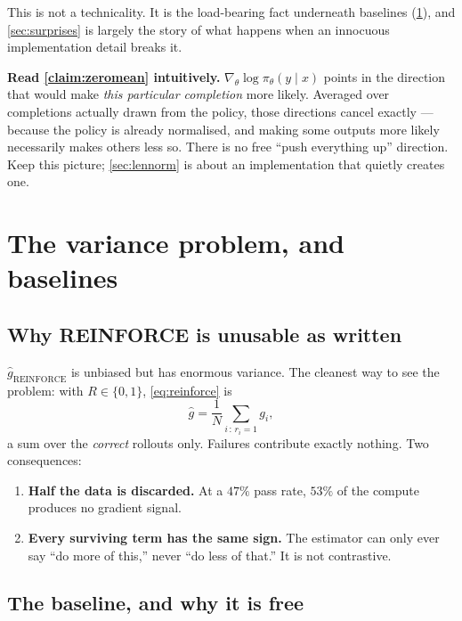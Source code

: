 \documentclass[11pt,letterpaper]{article}
\theoremstyle{definition}
\newcommand{\pol}{\pi_\theta}
\newcommand{\grad}{\nabla_\theta}
\newcommand{\score}{\grad \log \pol(y \mid x)}
\newcommand{\scorei}{g_i}
\begin{document}
This is not a technicality. It is the load-bearing fact underneath baselines
(\cref{sec:baseline}), and \cref{sec:surprises} is largely the story of what happens when an
innocuous implementation detail breaks it.

\begin{aside}
\textbf{Read \cref{claim:zeromean} intuitively.} $\score$ points in the direction that would make
\emph{this particular completion} more likely. Averaged over completions actually drawn from the
policy, those directions cancel exactly --- because the policy is already normalised, and making
some outputs more likely necessarily makes others less so. There is no free ``push everything up''
direction. Keep this picture; \cref{sec:lennorm} is about an implementation that quietly creates one.
\end{aside}

\section{The variance problem, and baselines}
\label{sec:baseline}

\subsection{Why REINFORCE is unusable as written}

$\hat{g}_{\text{REINFORCE}}$ is unbiased but has enormous variance. The cleanest way to see the
problem: with $R \in \{0,1\}$, \cref{eq:reinforce} is
\begin{equation}
  \hat{g} = \frac{1}{N}\sum_{i \,:\, r_i = 1} \scorei,
\end{equation}
a sum over the \emph{correct} rollouts only. Failures contribute exactly nothing. Two consequences:

\begin{enumerate}
  \item \textbf{Half the data is discarded.} At a $47\%$ pass rate, $53\%$ of the compute produces no
        gradient signal.
  \item \textbf{Every surviving term has the same sign.} The estimator can only ever say ``do more of
        this,'' never ``do less of that.'' It is not contrastive.
\end{enumerate}

\subsection{The baseline, and why it is free}
\end{document}

